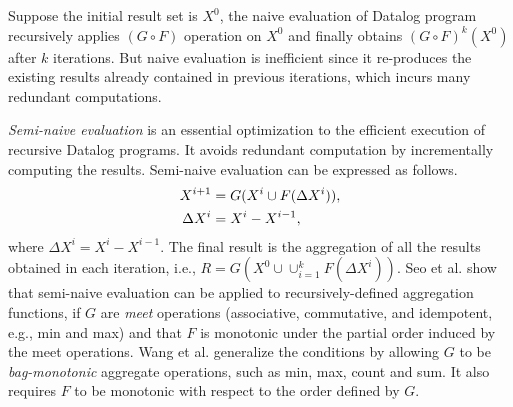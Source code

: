 Suppose the initial result set is $X^0$, the naive evaluation of Datalog program recursively applies $(G\circ F)$ operation on $X^0$ and finally obtains $(G\circ F)^k(X^0)$ after $k$ iterations. But naive evaluation is inefficient since it re-produces the existing results already contained in previous iterations, which incurs many redundant computations.

\textit{Semi-naive evaluation} is an essential optimization to the efficient execution of recursive Datalog programs. It avoids redundant computation by incrementally computing the results. Semi-naive evaluation can be expressed as follows.
\begin{equation}
\label{eq:seminaive}
\begin{aligned}
X^{i+1}&=G(X^{i} \cup F(\Delta X^{i})),\notag\\
  \Delta X^i&=X^i-X^{i-1}, 
\end{aligned}
\end{equation}
where $\Delta X^i=X^i-X^{i-1}$. The final result is the aggregation of all the results obtained in each iteration, i.e., $R=G(X^0\cup \cup_{i=1}^{k}F(\Delta X^i) )$. Seo et al. \cite{Lam:2013:SDE:2510649.2511289} show that semi-naive evaluation can be applied to recursively-defined aggregation functions, if $G$ are \textit{meet} operations (associative, commutative, and idempotent, e.g., min and max) and that $F$ is monotonic under the partial order induced by the meet operations. Wang et al. \cite{Wang:2015:AFR:2824032.2824052} generalize the conditions by allowing $G$ to be \textit{bag-monotonic} aggregate operations, such as min, max, count and sum. It also requires $F$ to be monotonic with respect to the order defined by $G$.







